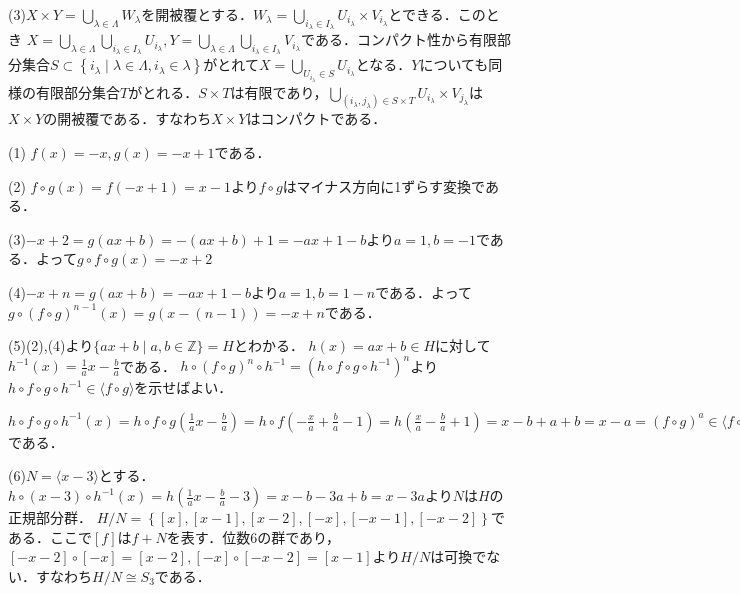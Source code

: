\documentclass[
		book,
		head_space=20mm,
		foot_space=20mm,
		gutter=10mm,
		line_length=190mm
]{jlreq}
\begin{document}
(3)$X\times Y = \bigcup\limits_{\lambda\in \Lambda} W_{\lambda}$を開被覆とする．$W_\lambda=\bigcup\limits_{i_{\lambda}\in I_\lambda}U_{i_\lambda} \times V_{i_\lambda}$とできる．このとき
$X=\bigcup\limits_{\lambda\in \Lambda}\bigcup\limits_{i_{\lambda}\in I_\lambda}U_{i_\lambda},Y=\bigcup\limits_{\lambda\in \Lambda}\bigcup\limits_{i_{\lambda}\in I_\lambda}V_{i_\lambda}$である．コンパクト性から有限部分集合$S \subset \left\{ i_{\lambda}\mid \lambda\in \Lambda, i_{\lambda}\in \lambda \right\}$がとれて$X=\bigcup\limits_{U_{i_{\lambda}}\in S}U_{i_{\lambda}}$となる．$Y$についても同様の有限部分集合$T$がとれる．$S\times T$は有限であり，$\bigcup\limits_{(i_{\lambda},j_{\lambda})\in S\times T}U_{i_{\lambda}}\times V_{j_{\lambda}}$は$X\times Y$の開被覆である．すなわち$X\times Y$はコンパクトである．

(1) $f(x)=-x,g(x)=-x+1$である．

(2) $f\circ g(x)=f(-x+1)=x-1$より$f\circ g$はマイナス方向に1ずらす変換である．

(3)$-x+2=g(ax+b)=-(ax+b)+1=-ax+1-b$より$a=1,b=-1$である．よって$g \circ f \circ g(x)=-x+2$

(4)$-x+n=g(ax+b)=-ax+1-b$より$a=1,b=1-n$である．よって$g\circ (f\circ g)^{n-1}(x)=g(x-(n-1))=-x+n$である．

(5)(2),(4)より$\{ax+b\mid a,b \in \mathbb{Z}\}=H$とわかる．
$h(x)=ax+b \in H$に対して$h^{-1}(x)=\frac{1}{a}x-\frac{b}{a}$である．
$h \circ (f \circ g)^n \circ h^{-1} =(h \circ f \circ g \circ h^{-1})^n$より$h \circ f \circ g \circ h^{-1}\in \langle f \circ g \rangle$を示せばよい．

$h \circ f \circ g \circ h^{-1}(x)=h \circ f \circ g (\frac{1}{a}x-\frac{b}{a})=h \circ f (-\frac{x}{a}+\frac{b}{a}-1)=h(\frac{x}{a}-\frac{b}{a}+1)=x -b+a +b=x-a=(f\circ g)^a\in \langle f \circ g \rangle$である．

(6)$N=\langle x-3\rangle$とする．$h \circ (x-3) \circ h^{-1}(x)=h(\frac{1}{a}x-\frac{b}{a}-3)=x-b-3a+b=x-3a$より$N$は$H$の正規部分群．
$H/N = \left\{ [x],[x-1],[x-2],[-x],[-x-1],[-x-2] \right\}$である．ここで$[f]$は$f+N$を表す．位数$6$の群であり，$[-x-2]\circ[-x]=[x-2],[-x]\circ[-x-2]=[x-1]$より$H/N$は可換でない．すなわち$H/N \cong S_3$である．
\end{document}
